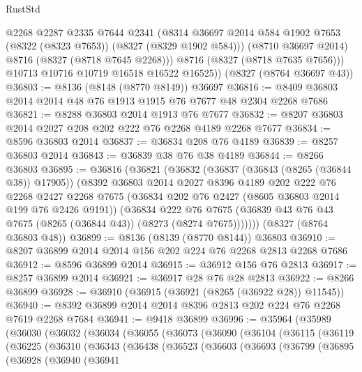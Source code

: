 \begin{lexlean}{RustStd}
\begin{coremodule}
{\begin{coremodule}
{{{{{{{{{{{{{{{{{{{{{{{{{{{{{{{{{{{{{{{{{{{{{{{{{{{{{{            @2268
            @2287
            @2335
            @7644
            @2341
            (@8314 @36697 @2014 @584 @1902 @7653 (@8322 (@8323 @7653)) (@8327 (@8329 @1902 @584)))
            (@8710 @36697 @2014)
            @8716
            (@8327 (@8718 @7645 @2268)))
          @8716
          (@8327 (@8718 @7635 @7656)))
        @10713
        @10716
        @10719
        @16518
        @16522
        @16525))
    (@8327 (@8764 @36697 @43))
@36803 := @8136 (@8148 (@8770 @8149)) @36697
@36816 := @8409 @36803 @2014 @2014 @48 @76 @1913 @1915 @76 @7677 @48 @2304 @2268 @7686
@36821 := @8288 @36803 @2014 @1913 @76 @7677
@36832 := @8207 @36803 @2014 @2027 @208 @202 @222 @76 @2268 @4189 @2268 @7677
@36834 := @8596 @36803 @2014
@36837 := @36834 @208 @76 @4189
@36839 := @8257 @36803 @2014
@36843 := @36839 @38 @76 @38 @4189
@36844 := @8266 @36803
@36895 := @36816
    (@36821
      (@36832
        (@36837 (@36843 (@8265 (@36844 @38)) @17905))
        (@8392
          @36803
          @2014
          @2027
          @8396
          @4189
          @202
          @222
          @76
          @2268
          @2427
          @2268
          @7675
          (@36834 @202 @76 @2427 (@8605 @36803 @2014 @199 @76 @2426 @9191))
          (@36834
            @222
            @76
            @7675
            (@36839 @43 @76 @43 @7675 (@8265 (@36844 @43)) (@8273 (@8274 @7675)))))))
    (@8327 (@8764 @36803 @48))
@36899 := @8136 (@8139 (@8770 @8144)) @36803
@36910 := @8207 @36899 @2014 @2014 @156 @202 @224 @76 @2268 @2813 @2268 @7686
@36912 := @8596 @36899 @2014
@36915 := @36912 @156 @76 @2813
@36917 := @8257 @36899 @2014
@36921 := @36917 @28 @76 @28 @2813
@36922 := @8266 @36899
@36928 := @36910 (@36915 (@36921 (@8265 (@36922 @28)) @11545))
@36940 := @8392 @36899 @2014 @2014 @8396 @2813 @202 @224 @76 @2268 @7619 @2268 @7684
@36941 := @9418 @36899
@36996 := @35964
    (@35989
      (@36030
        (@36032
          (@36034
            (@36055
              (@36073
                (@36090
                  (@36104
                    (@36115
                      (@36119
                        (@36225
                          (@36310
                            (@36343
                              (@36438
                                (@36523
                                  (@36603
                                    (@36693
                                      (@36799
                                        (@36895
                                          (@36928
                                            (@36940
                                              (@36941
}}}}}}}}}}}}}}}}}}}}}}}}}}}}}}}}}}}}}}}}}}}}}}}}}}}}}}
\end{coremodule}}
\end{coremodule}
\end{lexlean}

